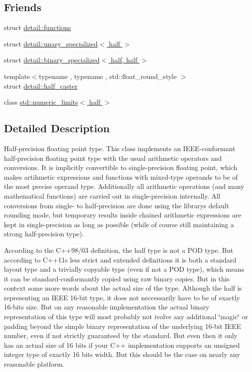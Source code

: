 \subsection*{Friends}
\begin{DoxyCompactItemize}
\item 
struct \hyperlink{classhalf__float_1_1half_a8c62dbcc77cd228ff65300d012535a09}{detail\+::functions}
\item 
struct \hyperlink{classhalf__float_1_1half_a66a5c900a45b9733983fc83ae3beaa4e}{detail\+::unary\+\_\+specialized$<$ half $>$}
\item 
struct \hyperlink{classhalf__float_1_1half_a0549e53309bef497d5ce1d1ad89c4bc4}{detail\+::binary\+\_\+specialized$<$ half, half $>$}
\item 
{\footnotesize template$<$typename , typename , std\+::float\+\_\+round\+\_\+style $>$ }\\struct \hyperlink{classhalf__float_1_1half_a2ff50b0344ffe4a76ba5d7c868fa8ffa}{detail\+::half\+\_\+caster}
\item 
class \hyperlink{classhalf__float_1_1half_a30984629ce0edc2c2e5de40c72ab0292}{std\+::numeric\+\_\+limits$<$ half $>$}
\end{DoxyCompactItemize}


\subsection{Detailed Description}
Half-\/precision floating point type. This class implements an I\+E\+E\+E-\/conformant half-\/precision floating point type with the usual arithmetic operators and conversions. It is implicitly convertible to single-\/precision floating point, which makes artihmetic expressions and functions with mixed-\/type operands to be of the most precise operand type. Additionally all arithmetic operations (and many mathematical functions) are carried out in single-\/precision internally. All conversions from single-\/ to half-\/precision are done using the library\textquotesingle{}s default rounding mode, but temporary results inside chained arithmetic expressions are kept in single-\/precision as long as possible (while of course still maintaining a strong half-\/precision type).

According to the C++98/03 definition, the half type is not a P\+OD type. But according to C++11\textquotesingle{}s less strict and extended definitions it is both a standard layout type and a trivially copyable type (even if not a P\+OD type), which means it can be standard-\/conformantly copied using raw binary copies. But in this context some more words about the actual size of the type. Although the half is representing an I\+E\+EE 16-\/bit type, it does not neccessarily have to be of exactly 16-\/bits size. But on any reasonable implementation the actual binary representation of this type will most probably not ivolve any additional \char`\"{}magic\char`\"{} or padding beyond the simple binary representation of the underlying 16-\/bit I\+E\+EE number, even if not strictly guaranteed by the standard. But even then it only has an actual size of 16 bits if your C++ implementation supports an unsigned integer type of exactly 16 bits width. But this should be the case on nearly any reasonable platform.

